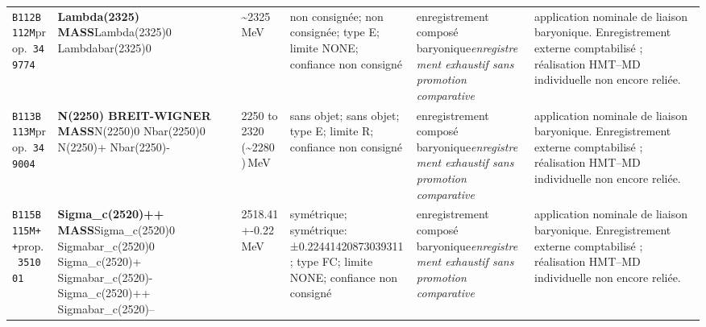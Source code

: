 \begin{landscape}
\begin{longtable}{L{1.85cm}L{4.45cm}L{2.35cm}L{4.05cm}L{3.35cm}L{7.15cm}}
\texttt{B112}\newline \texttt{B112M}\newline prop.\ \texttt{349774} & \textbf{Lambda(2325) MASS}\newline Lambda(2325)0 \textbar{}\allowbreak{} Lambdabar(2325)0 & \textasciitilde{}2325\,MeV & non consignée; non consignée; type E; limite NONE; confiance non consigné & enregistrement composé baryonique\newline \emph{enregistrement exhaustif sans promotion comparative} & application nominale de liaison baryonique. Enregistrement externe comptabilisé ; réalisation HMT--MD individuelle non encore reliée. \\
\texttt{B113}\newline \texttt{B113M}\newline prop.\ \texttt{349004} & \textbf{N(2250) BREIT-WIGNER MASS}\newline N(2250)0 \textbar{}\allowbreak{} Nbar(2250)0 \textbar{}\allowbreak{} N(2250)+ \textbar{}\allowbreak{} Nbar(2250)- & 2250 to 2320 (\textasciitilde{}2280)\,MeV & sans objet; sans objet; type E; limite R; confiance non consigné & enregistrement composé baryonique\newline \emph{enregistrement exhaustif sans promotion comparative} & application nominale de liaison baryonique. Enregistrement externe comptabilisé ; réalisation HMT--MD individuelle non encore reliée. \\
\texttt{B115}\newline \texttt{B115M++}\newline prop.\ \texttt{351001} & \textbf{Sigma\_\allowbreak{}c(2520)++ MASS}\newline Sigma\_\allowbreak{}c(2520)0 \textbar{}\allowbreak{} Sigmabar\_\allowbreak{}c(2520)0 \textbar{}\allowbreak{} Sigma\_\allowbreak{}c(2520)+ \textbar{}\allowbreak{} Sigmabar\_\allowbreak{}c(2520)- \textbar{}\allowbreak{} Sigma\_\allowbreak{}c(2520)++ \textbar{}\allowbreak{} Sigmabar\_\allowbreak{}c(2520)-- & 2518.41+-0.22\,MeV & symétrique; symétrique: ±0.22441420873039311; type FC; limite NONE; confiance non consigné & enregistrement composé baryonique\newline \emph{enregistrement exhaustif sans promotion comparative} & application nominale de liaison baryonique. Enregistrement externe comptabilisé ; réalisation HMT--MD individuelle non encore reliée. \\

\end{longtable}
\end{landscape}

